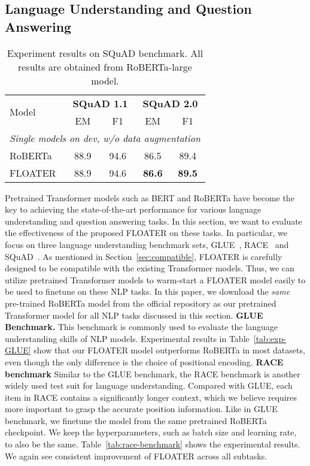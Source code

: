 \documentclass[11pt]{article}
\begin{document}
\subsection{Language Understanding and Question Answering}
\label{sec:exp-luqa}
\begin{table}[htb]
    \centering
    \caption{Experiment results on SQuAD benchmark. All results are obtained from RoBERTa-large model.\label{tab:squad}}
    \begin{tabular}{lcccc}
    \toprule
    \multirow{2}{*}{Model}     &  \multicolumn{2}{c}{\textbf{SQuAD 1.1}} & \multicolumn{2}{c}{\textbf{SQuAD 2.0}}\\
    & EM & F1 & EM & F1 \\
    \midrule
    \multicolumn{5}{l}{\textit{Single models on dev, w/o data augmentation}}\\
RoBERTa   & 88.9 & 94.6 & 86.5 & 89.4 \\
    FLOATER    & 88.9 & 94.6 & \textbf{86.6} & \textbf{89.5} \\
    \bottomrule
    \end{tabular}
\end{table}
Pretrained Transformer models such as BERT and RoBERTa have become the key to achieving the state-of-the-art performance for various language understanding and question answering tasks. In this section, we want to evaluate the effectiveness of the proposed FLOATER on these tasks. In particular, we focus on three language understanding benchmark sets, GLUE~\cite{wang2018glue}, RACE~\cite{lai2017race} and SQuAD~\cite{rajpurkar2016squad}.
As mentioned in Section~\ref{sec:compatible}, FLOATER is carefully designed to be compatible with the existing Transformer models. 
Thus, we can utilize pretrained Transformer models to warm-start a FLOATER model easily to be used to finetune on these NLP tasks. 
In this paper, we download the \emph{same} pre-trained RoBERTa model from the official repository as our pretrained Transformer model for all NLP tasks discussed in this section.  
{\bf GLUE Benchmark.}
This benchmark is commonly used to evaluate the language understanding skills of NLP models. Experimental results in Table~\ref{tab:exp-GLUE} show that our FLOATER model outperforms RoBERTa in most datasets, even though the only difference is the choice of positional encoding.
\textbf{RACE benchmark}
Similar to the GLUE benchmark, the RACE benchmark is another widely used test suit for language understanding. Compared with GLUE, each item in RACE contains a significantly longer context, which we believe requires more important to grasp the accurate position information. Like in GLUE benchmark, we finetune the model from the same pretrained RoBERTa checkpoint. We keep the hyperparameters, such as batch size and learning rate, to also be the same. Table~\ref{tab:race-benchmark} shows the experimental results. We again see consistent improvement of FLOATER across all subtasks.
\end{document}
